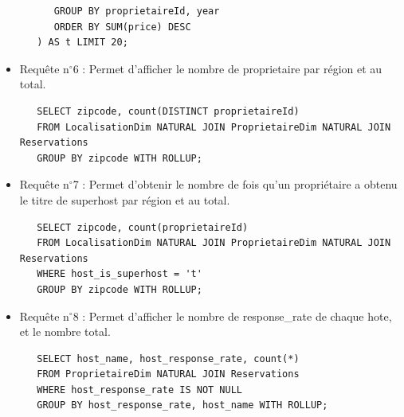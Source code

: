 \documentclass[11pt, a4paper]{article}
\begin{document}
\begin{itemize}[label=\textbullet]
\begin{lstlisting}
      GROUP BY proprietaireId, year
      ORDER BY SUM(price) DESC
   ) AS t LIMIT 20;
   \end{lstlisting}
   \item Requête n$^\circ$6 :
   Permet d'afficher le nombre de proprietaire par région et au total.
   \begin{lstlisting}
   SELECT zipcode, count(DISTINCT proprietaireId)
   FROM LocalisationDim NATURAL JOIN ProprietaireDim NATURAL JOIN Reservations
   GROUP BY zipcode WITH ROLLUP;
   \end{lstlisting}
   \item Requête n$^\circ$7 :
   Permet d'obtenir le nombre de fois qu'un propriétaire a obtenu le titre de superhost par région et au total.
   \begin{lstlisting}
   SELECT zipcode, count(proprietaireId)
   FROM LocalisationDim NATURAL JOIN ProprietaireDim NATURAL JOIN Reservations
   WHERE host_is_superhost = 't'
   GROUP BY zipcode WITH ROLLUP;
   \end{lstlisting}
   \item Requête n$^\circ$8 :
   Permet d'afficher le nombre de response\_rate de chaque hote, et le nombre total.
   \begin{lstlisting}
   SELECT host_name, host_response_rate, count(*)
   FROM ProprietaireDim NATURAL JOIN Reservations
   WHERE host_response_rate IS NOT NULL
   GROUP BY host_response_rate, host_name WITH ROLLUP;
   \end{lstlisting}
\end{itemize}
\end{document}
